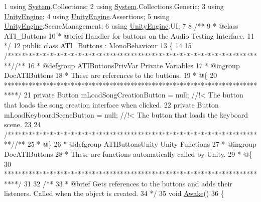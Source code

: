 \begin{DoxyCodeInclude}
1 \textcolor{keyword}{using} \hyperlink{namespace_system}{System}.Collections;
2 \textcolor{keyword}{using} \hyperlink{namespace_system}{System}.Collections.Generic;
3 \textcolor{keyword}{using} \hyperlink{namespace_unity_engine}{UnityEngine};
4 \textcolor{keyword}{using} \hyperlink{namespace_unity_engine}{UnityEngine}.Assertions;
5 \textcolor{keyword}{using} \hyperlink{namespace_unity_engine}{UnityEngine}.SceneManagement;
6 \textcolor{keyword}{using} \hyperlink{namespace_unity_engine}{UnityEngine}.UI;
7 \textcolor{comment}{}
8 \textcolor{comment}{/**}
9 \textcolor{comment}{ * @class ATI\_Buttons}
10 \textcolor{comment}{ * @brief Handler for buttons on the Audio Testing Interface.}
11 \textcolor{comment}{*/}
12 \textcolor{keyword}{public} \textcolor{keyword}{class }\hyperlink{class_a_t_i___buttons}{ATI\_Buttons} : MonoBehaviour
13 \{
14 
15     \textcolor{comment}{/*************************************************************************/}\textcolor{comment}{/** }
16 \textcolor{comment}{    * @defgroup ATIButtonsPrivVar Private Variables}
17 \textcolor{comment}{    * @ingroup DocATIButtons}
18 \textcolor{comment}{    * These are references to the buttons.}
19 \textcolor{comment}{    * @\{}
20 \textcolor{comment}{    ****************************************************************************/}
21     \textcolor{keyword}{private} Button      mLoadSongCreationButton = null; \textcolor{comment}{//!< The button that loads the song creation
       interface when clicked.}
22 \textcolor{comment}{}    \textcolor{keyword}{private} Button      mLoadKeyboardSceneButton = null; \textcolor{comment}{//!< The button that loads the keyboard scene.}
23 \textcolor{comment}{}
24     \textcolor{comment}{/*************************************************************************/}\textcolor{comment}{/** }
25 \textcolor{comment}{    * @\}}
26 \textcolor{comment}{    * @defgroup ATIButtonsUnity Unity Functions}
27 \textcolor{comment}{    * @ingroup DocATIButtons}
28 \textcolor{comment}{    * These are functions automatically called by Unity.}
29 \textcolor{comment}{    * @\{}
30 \textcolor{comment}{    ****************************************************************************/}
31 \textcolor{comment}{}
32 \textcolor{comment}{    /**}
33 \textcolor{comment}{     * @brief Gets references to the buttons and adds their listeners. Called when the object is created.}
34 \textcolor{comment}{    */}
35     \textcolor{keywordtype}{void} \hyperlink{group___a_t_i_buttons_unity_gaa24ae34a40539dab6595d1713fc77560}{Awake}()
36     \{

\end{DoxyCodeInclude}
